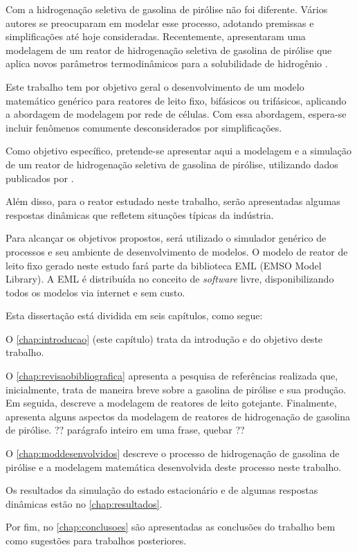 Com a hidrogenação seletiva de gasolina de pirólise não
foi diferente. Vários autores se preocuparam em modelar esse
processo, adotando premissas e simplificações até hoje consideradas.
Recentemente,  apresentaram uma modelagem de
um reator de hidrogenação seletiva de gasolina de pirólise que aplica novos
parâmetros termodinâmicos para a solubilidade de hidrogênio \cite{Rojas2014}. 

Este trabalho tem por objetivo geral o desenvolvimento de um modelo
matemático genérico para reatores de leito fixo, bifásicos ou trifásicos,
aplicando a abordagem de modelagem por rede de células. Com essa
abordagem, espera-se incluir fenômenos comumente desconsiderados por
simplificações.

Como objetivo específico, pretende-se apresentar aqui a modelagem e a
simulação de um reator de hidrogenação seletiva de gasolina de pirólise,
utilizando dados publicados por .

Além disso, para o reator estudado neste trabalho, serão
apresentadas algumas respostas dinâmicas que refletem situações típicas da
indústria.

Para alcançar os objetivos propostos, será utilizado o simulador genérico de
processos \emso{} \cite{Soares2003} e seu ambiente de desenvolvimento de
modelos. O modelo de reator de leito fixo gerado neste estudo fará parte da
biblioteca EML (EMSO Model Library). A EML é distribuída no conceito de
\emph{software} livre, disponibilizando todos os modelos via internet e sem custo.

Esta dissertação está dividida em seis capítulos, como segue:

O \autoref{chap:introducao} (este capítulo) trata da introdução e do objetivo
deste trabalho.

O \autoref{chap:revisaobibliografica} apresenta a pesquisa de referências
realizada que, inicialmente, trata de maneira breve sobre a gasolina de pirólise
e sua produção. Em seguida, descreve a modelagem de reatores de
leito gotejante. Finalmente, apresenta alguns aspectos da modelagem de
reatores de hidrogenação de gasolina de pirólise.
?? parágrafo inteiro em uma frase, quebar ??

O \autoref{chap:moddesenvolvidos} descreve o processo de
hidrogenação de gasolina de pirólise e a modelagem matemática
desenvolvida deste processo neste trabalho.

Os resultados da simulação do estado estacionário e de algumas
respostas dinâmicas estão no \autoref{chap:resultados}.

Por fim, no \autoref{chap:conclusoes} são apresentadas as conclusões do
trabalho bem como sugestões para trabalhos posteriores.
